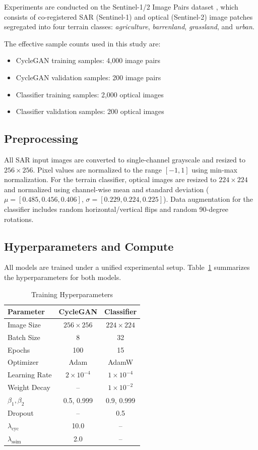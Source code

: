 \documentclass[conference]{IEEEtran}
\begin{document}
Experiments are conducted on the Sentinel-1/2 Image Pairs dataset \cite{schmitt2018sen12}, which consists of co-registered SAR (Sentinel-1) and optical (Sentinel-2) image patches segregated into four terrain classes: \textit{agriculture}, \textit{barrenland}, \textit{grassland}, and \textit{urban}.

The effective sample counts used in this study are:
\begin{itemize}
    \item CycleGAN training samples: 4,000 image pairs
    \item CycleGAN validation samples: 200 image pairs
    \item Classifier training samples: 2,000 optical images
    \item Classifier validation samples: 200 optical images
\end{itemize}

\subsection{Preprocessing}

All SAR input images are converted to single-channel grayscale and resized to $256 \times 256$. Pixel values are normalized to the range $[-1, 1]$ using min-max normalization. For the terrain classifier, optical images are resized to $224 \times 224$ and normalized using channel-wise mean and standard deviation ($\mu = [0.485, 0.456, 0.406]$, $\sigma = [0.229, 0.224, 0.225]$). Data augmentation for the classifier includes random horizontal/vertical flips and random 90-degree rotations.

\subsection{Hyperparameters and Compute}

All models are trained under a unified experimental setup. Table~\ref{tab:hyperparams} summarizes the hyperparameters for both models.

\begin{table}[htbp]
\caption{Training Hyperparameters}
\label{tab:hyperparams}
\centering
\begin{tabular}{lcc}
\toprule
\textbf{Parameter} & \textbf{CycleGAN} & \textbf{Classifier} \\
\midrule
Image Size & $256 \times 256$ & $224 \times 224$ \\
Batch Size & 8 & 32 \\
Epochs & 100 & 15 \\
Optimizer & Adam & AdamW \\
Learning Rate & $2 \times 10^{-4}$ & $1 \times 10^{-4}$ \\
Weight Decay & -- & $1 \times 10^{-2}$ \\
$\beta_1, \beta_2$ & 0.5, 0.999 & 0.9, 0.999 \\
Dropout & -- & 0.5 \\
$\lambda_{\text{cyc}}$ & 10.0 & -- \\
$\lambda_{\text{ssim}}$ & 2.0 & -- \\
\bottomrule
\end{tabular}
\end{table}
\end{document}
